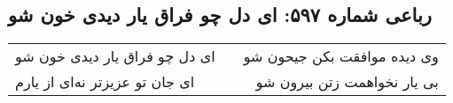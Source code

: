 \begin{center}
\section*{رباعی شماره ۵۹۷: ای دل چو فراق یار دیدی خون شو}
\label{sec:sh597}
\begin{longtable}{l p{0.5cm} r}
ای دل چو فراق یار دیدی خون شو
&&
وی دیده موافقت بکن جیحون شو
\\
ای جان تو عزیزتر نه‌ای از یارم
&&
بی یار نخواهمت زتن بیرون شو
\\
\end{longtable}
\end{center}
